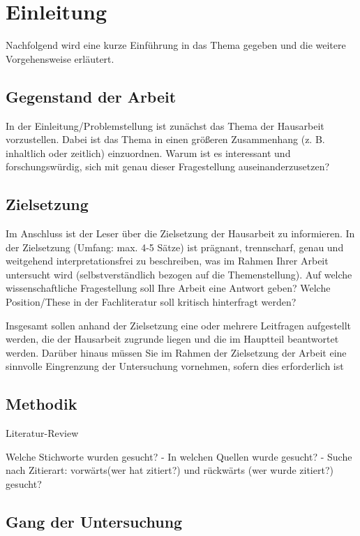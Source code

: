 \chapter{Einleitung}

Nachfolgend wird eine kurze Einführung in das Thema gegeben und die weitere Vorgehensweise erläutert.

\section{Gegenstand der Arbeit}

In der Einleitung/Problemstellung ist zunächst das Thema der Hausarbeit vorzustellen. Dabei ist das Thema in einen größeren Zusammenhang (z. B. inhaltlich oder zeitlich) einzuordnen. Warum ist es interessant und forschungswürdig, sich mit genau dieser Fragestellung auseinanderzusetzen?



\section{Zielsetzung}

Im Anschluss ist der Leser über die Zielsetzung der Hausarbeit zu informieren. In der Zielsetzung (Umfang: max. 4-5 Sätze) ist prägnant, trennscharf, genau und weitgehend interpretationsfrei zu beschreiben, was im Rahmen Ihrer Arbeit untersucht wird (selbstverständlich bezogen auf die Themenstellung).
Auf welche wissenschaftliche Fragestellung soll Ihre Arbeit eine Antwort geben? Welche Position/These in der Fachliteratur soll kritisch hinterfragt werden?

Insgesamt sollen anhand der Zielsetzung eine oder mehrere Leitfragen aufgestellt werden, die der Hausarbeit zugrunde liegen und die im Hauptteil beantwortet werden.
Darüber hinaus müssen Sie im Rahmen der Zielsetzung der Arbeit eine sinnvolle Eingrenzung der Untersuchung vornehmen, sofern dies erforderlich ist

\section{Methodik}

Literatur-Review

 Welche Stichworte wurden gesucht?
- In welchen Quellen wurde gesucht?
- Suche nach Zitierart: vorwärts(wer hat zitiert?) und rückwärts (wer wurde zitiert?) gesucht?

\section{Gang der Untersuchung}

